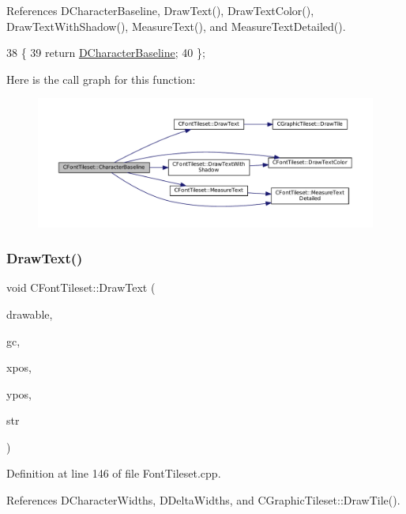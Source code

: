 References D\+Character\+Baseline, Draw\+Text(), Draw\+Text\+Color(), Draw\+Text\+With\+Shadow(), Measure\+Text(), and Measure\+Text\+Detailed().


\begin{DoxyCode}
38                                       \{
39             \textcolor{keywordflow}{return} \hyperlink{classCFontTileset_aba19d07744c08aeb957728067c52466c}{DCharacterBaseline};  
40         \};
\end{DoxyCode}
Here is the call graph for this function\+:\nopagebreak
\begin{figure}[H]
\begin{center}
\leavevmode
\includegraphics[width=350pt]{classCFontTileset_a888dd4fe8f46b35550386a1997f4376a_cgraph}
\end{center}
\end{figure}
\hypertarget{classCFontTileset_a4121603694e96e93378e079edd27086e}{}\label{classCFontTileset_a4121603694e96e93378e079edd27086e} 
\subsubsection{\texorpdfstring{Draw\+Text()}{DrawText()}}
{\footnotesize\ttfamily void C\+Font\+Tileset\+::\+Draw\+Text (\begin{DoxyParamCaption}\item[{Gdk\+Drawable $\ast$}]{drawable,  }\item[{Gdk\+GC $\ast$}]{gc,  }\item[{gint}]{xpos,  }\item[{gint}]{ypos,  }\item[{const std\+::string \&}]{str }\end{DoxyParamCaption})}



Definition at line 146 of file Font\+Tileset.\+cpp.



References D\+Character\+Widths, D\+Delta\+Widths, and C\+Graphic\+Tileset\+::\+Draw\+Tile().




